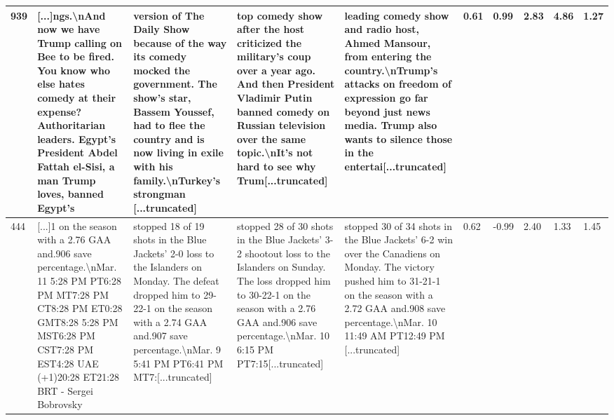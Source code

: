 \documentclass{article}
\theoremstyle{plain}
\theoremstyle{definition}
\theoremstyle{remark}
\begin{document}
\begin{table}[t]
\begin{tabular}{p{0.2cm}|p{2.75cm}|p{2.75cm}|p{2.75cm}|p{2.75cm}|p{0.2cm}|p{0.42cm}|p{0.42cm}|p{0.3cm}|p{0.3cm}}
 939 &  [...]ngs.\textbackslash nAnd now we have Trump calling on Bee to be fired. You know who else hates comedy at their expense? Authoritarian leaders. Egypt’s President Abdel Fattah el-Sisi, a man Trump loves, banned Egypt’s &   version of The Daily Show because of the way its comedy mocked the government. The show’s star, Bassem Youssef, had to flee the country and is now living in exile with his family.\textbackslash nTurkey’s strongman [...truncated] &   top comedy show after the host criticized the military’s coup over a year ago. And then President Vladimir Putin banned comedy on Russian television over the same topic.\textbackslash nIt’s not hard to see why Trum[...truncated] &                             leading comedy show and radio host, Ahmed Mansour, from entering the country.\textbackslash nTrump’s attacks on freedom of expression go far beyond just news media. Trump also wants to silence those in the entertai[...truncated] &               0.61 &           0.99 &          2.83 &       4.86 &      1.27 \\\midrule
 444 &  [...]1 on the season with a 2.76 GAA and.906 save percentage.\textbackslash nMar. 11 5:28 PM PT6:28 PM MT7:28 PM CT8:28 PM ET0:28 GMT8:28 5:28 PM MST6:28 PM CST7:28 PM EST4:28 UAE (+1)20:28 ET21:28 BRT - Sergei Bobrovsky &   stopped 18 of 19 shots in the Blue Jackets' 2-0 loss to the Islanders on Monday. The defeat dropped him to 29-22-1 on the season with a 2.74 GAA and.907 save percentage.\textbackslash nMar. 9 5:41 PM PT6:41 PM MT7:[...truncated] &   stopped 28 of 30 shots in the Blue Jackets' 3-2 shootout loss to the Islanders on Sunday. The loss dropped him to 30-22-1 on the season with a 2.76 GAA and.906 save percentage.\textbackslash nMar. 10 6:15 PM PT7:15[...truncated] &                             stopped 30 of 34 shots in the Blue Jackets' 6-2 win over the Canadiens on Monday. The victory pushed him to 31-21-1 on the season with a 2.72 GAA and.908 save percentage.\textbackslash nMar. 10 11:49 AM PT12:49 PM [...truncated] &               0.62 &          -0.99 &          2.40 &       1.33 &      1.45 \\\midrule

\end{tabular}
\end{table}
\end{document}

